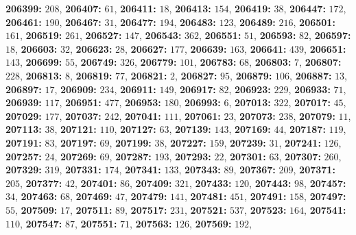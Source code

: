 \textsf{\bfseries 206399:} $208$, \textsf{\bfseries 206407:} $61$, \textsf{\bfseries 206411:} $18$, \textsf{\bfseries 206413:} $154$, \textsf{\bfseries 206419:} $38$, \textsf{\bfseries 206447:} $172$, \textsf{\bfseries 206461:} $190$, \textsf{\bfseries 206467:} $31$, \textsf{\bfseries 206477:} $194$, \textsf{\bfseries 206483:} $123$, \textsf{\bfseries 206489:} $216$, \textsf{\bfseries 206501:} $161$, \textsf{\bfseries 206519:} $261$, \textsf{\bfseries 206527:} $147$, \textsf{\bfseries 206543:} $362$, \textsf{\bfseries 206551:} $51$, \textsf{\bfseries 206593:} $82$, \textsf{\bfseries 206597:} $18$, \textsf{\bfseries 206603:} $32$, \textsf{\bfseries 206623:} $28$, \textsf{\bfseries 206627:} $177$, \textsf{\bfseries 206639:} $163$, \textsf{\bfseries 206641:} $439$, \textsf{\bfseries 206651:} $143$, \textsf{\bfseries 206699:} $55$, \textsf{\bfseries 206749:} $326$, \textsf{\bfseries 206779:} $101$, \textsf{\bfseries 206783:} $68$, \textsf{\bfseries 206803:} $7$, \textsf{\bfseries 206807:} $228$, \textsf{\bfseries 206813:} $8$, \textsf{\bfseries 206819:} $77$, \textsf{\bfseries 206821:} $2$, \textsf{\bfseries 206827:} $95$, \textsf{\bfseries 206879:} $106$, \textsf{\bfseries 206887:} $13$, \textsf{\bfseries 206897:} $17$, \textsf{\bfseries 206909:} $234$, \textsf{\bfseries 206911:} $149$, \textsf{\bfseries 206917:} $82$, \textsf{\bfseries 206923:} $229$, \textsf{\bfseries 206933:} $71$, \textsf{\bfseries 206939:} $117$, \textsf{\bfseries 206951:} $477$, \textsf{\bfseries 206953:} $180$, \textsf{\bfseries 206993:} $6$, \textsf{\bfseries 207013:} $322$, \textsf{\bfseries 207017:} $45$, \textsf{\bfseries 207029:} $177$, \textsf{\bfseries 207037:} $242$, \textsf{\bfseries 207041:} $111$, \textsf{\bfseries 207061:} $23$, \textsf{\bfseries 207073:} $238$, \textsf{\bfseries 207079:} $11$, \textsf{\bfseries 207113:} $38$, \textsf{\bfseries 207121:} $110$, \textsf{\bfseries 207127:} $63$, \textsf{\bfseries 207139:} $143$, \textsf{\bfseries 207169:} $44$, \textsf{\bfseries 207187:} $119$, \textsf{\bfseries 207191:} $83$, \textsf{\bfseries 207197:} $69$, \textsf{\bfseries 207199:} $38$, \textsf{\bfseries 207227:} $159$, \textsf{\bfseries 207239:} $31$, \textsf{\bfseries 207241:} $126$, \textsf{\bfseries 207257:} $24$, \textsf{\bfseries 207269:} $69$, \textsf{\bfseries 207287:} $193$, \textsf{\bfseries 207293:} $22$, \textsf{\bfseries 207301:} $63$, \textsf{\bfseries 207307:} $260$, \textsf{\bfseries 207329:} $319$, \textsf{\bfseries 207331:} $174$, \textsf{\bfseries 207341:} $133$, \textsf{\bfseries 207343:} $89$, \textsf{\bfseries 207367:} $209$, \textsf{\bfseries 207371:} $205$, \textsf{\bfseries 207377:} $42$, \textsf{\bfseries 207401:} $86$, \textsf{\bfseries 207409:} $321$, \textsf{\bfseries 207433:} $120$, \textsf{\bfseries 207443:} $98$, \textsf{\bfseries 207457:} $34$, \textsf{\bfseries 207463:} $68$, \textsf{\bfseries 207469:} $47$, \textsf{\bfseries 207479:} $141$, \textsf{\bfseries 207481:} $451$, \textsf{\bfseries 207491:} $158$, \textsf{\bfseries 207497:} $55$, \textsf{\bfseries 207509:} $17$, \textsf{\bfseries 207511:} $89$, \textsf{\bfseries 207517:} $231$, \textsf{\bfseries 207521:} $537$, \textsf{\bfseries 207523:} $164$, \textsf{\bfseries 207541:} $110$, \textsf{\bfseries 207547:} $87$, \textsf{\bfseries 207551:} $71$, \textsf{\bfseries 207563:} $126$, \textsf{\bfseries 207569:} $192$, 
